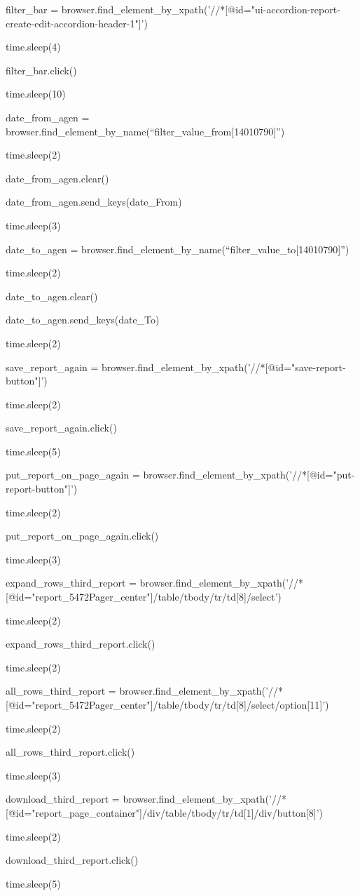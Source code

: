 \documentclass[]{article}
\begin{document}
filter\_bar =
browser.find\_element\_by\_xpath('//*{[}@id="ui-accordion-report-create-edit-accordion-header-1"{]}')

time.sleep(4)

filter\_bar.click()

time.sleep(10)

date\_from\_agen =
browser.find\_element\_by\_name(``filter\_value\_from{[}14010790{]}'')

time.sleep(2)

date\_from\_agen.clear()

date\_from\_agen.send\_keys(date\_From)

time.sleep(3)

date\_to\_agen =
browser.find\_element\_by\_name(``filter\_value\_to{[}14010790{]}'')

time.sleep(2)

date\_to\_agen.clear()

date\_to\_agen.send\_keys(date\_To)

time.sleep(2)

save\_report\_again =
browser.find\_element\_by\_xpath('//*{[}@id="save-report-button"{]}')

time.sleep(2)

save\_report\_again.click()

time.sleep(5)

put\_report\_on\_page\_again =
browser.find\_element\_by\_xpath('//*{[}@id="put-report-button"{]}')

time.sleep(2)

put\_report\_on\_page\_again.click()

time.sleep(3)

expand\_rows\_third\_report =
browser.find\_element\_by\_xpath('//*{[}@id="report\_5472Pager\_center"{]}/table/tbody/tr/td{[}8{]}/select')

time.sleep(2)

expand\_rows\_third\_report.click()

time.sleep(2)

all\_rows\_third\_report =
browser.find\_element\_by\_xpath('//*{[}@id="report\_5472Pager\_center"{]}/table/tbody/tr/td{[}8{]}/select/option{[}11{]}')

time.sleep(2)

all\_rows\_third\_report.click()

time.sleep(3)

download\_third\_report =
browser.find\_element\_by\_xpath('//*{[}@id="report\_page\_container"{]}/div/table/tbody/tr/td{[}1{]}/div/button{[}8{]}')

time.sleep(2)

download\_third\_report.click()

time.sleep(5)
\end{document}
